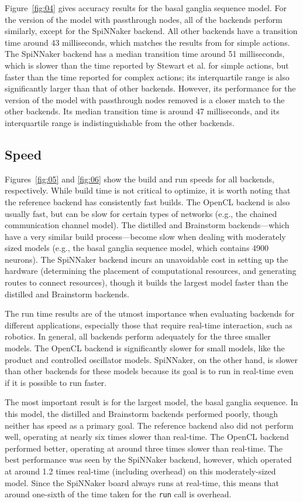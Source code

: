 \documentclass{frontiersSCNS}
\begin{document}
Figure~\ref{fig:04} gives accuracy results
for the basal ganglia sequence model.
For the version of the model with passthrough nodes,
all of the backends perform similarly,
except for the SpiNNaker backend.
All other backends have a transition time
around 43 milliseconds, which matches
the results from \citet{stewart2010}
for simple actions.
The SpiNNaker backend has a median transition time
around 51 milliseconds, which is slower
than the time reported by Stewart et al.
for simple actions, but faster than the
time reported for complex actions;
its interquartile range
is also significantly larger
than that of other backends.
However, its performance for
the version of the model
with passthrough nodes removed
is a closer match to the other backends.
Its median transition time
is around 47 milliseconds,
and its interquartile range
is indistinguishable from the other backends.

\subsection{Speed}

Figures~\ref{fig:05} and \ref{fig:06} show
the build and run speeds for all backends, respectively.
While build time is not critical to optimize,
it is worth noting that the reference backend
has consistently fast builds.
The OpenCL backend is also usually fast,
but can be slow for certain types of networks
(e.g., the chained communication channel model).
The distilled and Brainstorm backends---which
have a very similar build process---become
slow when dealing with moderately sized models
(e.g., the basal ganglia sequence model,
which contains 4900 neurons).
The SpiNNaker backend incurs an unavoidable cost
in setting up the hardware
(determining the placement of computational resources,
and generating routes to connect resources),
though it builds the largest model faster than
the distilled and Brainstorm backends.

The run time results are of the utmost importance
when evaluating backends for different applications,
especially those that require real-time interaction,
such as robotics. In general, all backends
perform adequately for the three smaller models.
The OpenCL backend is significantly slower for small
models, like the product and controlled oscillator models.
SpiNNaker, on the other hand, is slower than other backends
for these models because its goal
is to run in real-time even if it is possible to run faster.

The most important result is for the largest model,
the basal ganglia sequence.
In this model, the distilled and Brainstorm backends
performed poorly,
though neither has speed as a primary goal.
The reference backend also did not perform well,
operating at nearly six times slower than real-time.
The OpenCL backend performed better, operating at around
three times slower than real-time.
The best performance was seen by the SpiNNaker backend,
however, which operated at around 1.2 times real-time
(including overhead) on this moderately-sized model.
Since the SpiNNaker board always runs at real-time,
this means that around one-sixth of the time taken
for the \texttt{run} call is overhead.
\end{document}
